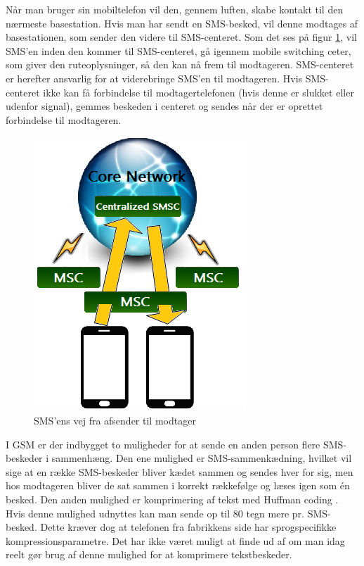 Når man bruger sin mobiltelefon vil den, gennem luften, skabe kontakt til den nærmeste basestation. Hvis man har sendt en SMS-besked, vil denne modtages af basestationen, som sender den videre til SMS-centeret. Som det ses på figur \ref{GSM}, vil SMS'en inden den kommer til SMS-centeret, gå igennem mobile switching ceter, som giver den ruteoplysninger, så den kan nå frem til modtageren. SMS-centeret er herefter ansvarlig for at viderebringe SMS’en til modtageren. Hvis SMS-centeret ikke kan få forbindelse til modtagertelefonen (hvis denne er slukket eller udenfor signal), gemmes beskeden i centeret og sendes når der er oprettet forbindelse til modtageren. \cite{info}

\begin{figure}[H]
\centering
\includegraphics []{Billeder/GSMnetvaerk.png}
\caption {SMS'ens vej fra afsender til modtager \cite{info}}
\label {GSM}
\end{figure} 

I GSM er der indbygget to muligheder for at sende en anden person flere SMS-beskeder i sammenhæng. Den ene mulighed er SMS-sammenkædning, hvilket vil sige at en række SMS-beskeder bliver kædet sammen og sendes hver for sig, men hos modtageren bliver de sat sammen i korrekt rækkefølge og læses igen som én besked. Den anden mulighed er komprimering af tekst med Huffman coding \cite{UNI}. Hvis denne mulighed udnyttes kan man sende op til 80 tegn mere pr. SMS-besked. Dette kræver dog at telefonen fra fabrikkens side har sprogspecifikke kompressionsparametre. Det har ikke været muligt at finde ud af om man idag reelt gør brug af denne mulighed for at komprimere tekstbeskeder. 
